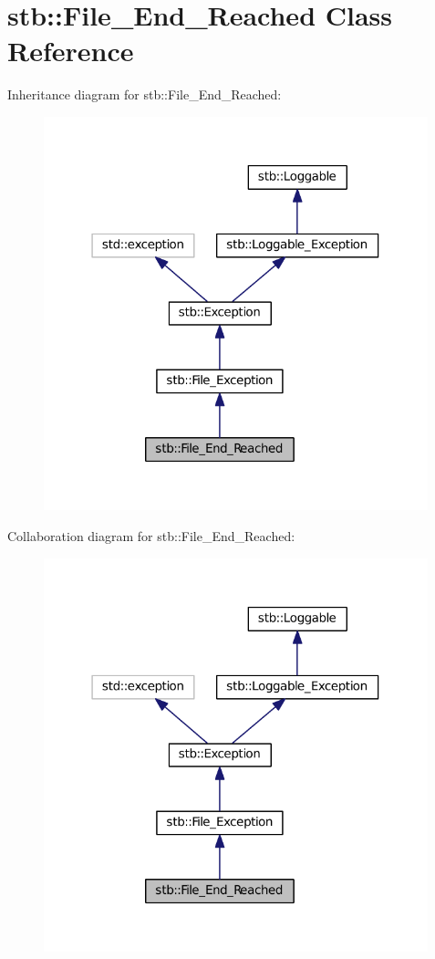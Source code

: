 \hypertarget{classstb_1_1File__End__Reached}{\section{stb\+:\+:File\+\_\+\+End\+\_\+\+Reached Class Reference}
\label{classstb_1_1File__End__Reached}
}


Inheritance diagram for stb\+:\+:File\+\_\+\+End\+\_\+\+Reached\+:
\nopagebreak
\begin{figure}[H]
\begin{center}
\leavevmode
\includegraphics[width=316pt]{classstb_1_1File__End__Reached__inherit__graph}
\end{center}
\end{figure}


Collaboration diagram for stb\+:\+:File\+\_\+\+End\+\_\+\+Reached\+:
\nopagebreak
\begin{figure}[H]
\begin{center}
\leavevmode
\includegraphics[width=316pt]{classstb_1_1File__End__Reached__coll__graph}
\end{center}
\end{figure}
